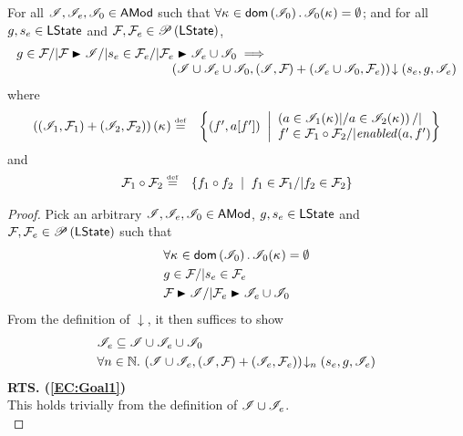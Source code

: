 \begin{lemma}\label{lem:extend-closure}
%
For all $\mathscr{I}, \mathscr{I}_{e}, \mathscr{I}_{0} \in \textsf{AMod}$ such that $\forall \kappa_{} \in \textsf{dom}\left( \mathscr{I}_0 \right).\, \mathscr{I}_0(\kappa_{}) = \emptyset$; and for all $g, s_e \in \textsf{LState}$ and $\mathcal{F}_{}, \mathcal{F}_{e} \in \mathscr{P}\left(\textsf{LState} \right)$,
\[
\begin{array}{l l}
	g \in \fence{} /| \fence{} \strictfences \lmod /| s_e \in \fence{e} /| \fence{e} \strictfences \lmod_e \cup \lmod_0
	\implies & \\
	& \hspace{-3cm} \extendsAM{\lmod \cup \lmod_{e} \cup \lmod_0, (\lmod, \fence{}) + (\lmod_{e} \cup \lmod_0, \fence{e}) }{s_{e}}{g}{\lmod_{e}}
\end{array}
\]
%
where
%
\[
\begin{array}{@{} l  l @{}}
	\left( (\lmod_1, \fence{1}) + (\lmod_{2}, \fence{2}) \right)(\ca{}) \eqdef  & 
	\left\{
		(f', a[f']) \;\;\middle|
		\begin{array}{ l @{}}
			\left(a \in \lmod_{1}(\ca{}) |/ a \in \lmod_{2}(\ca{})  \right) /| \\
			f' \in \fence{1} \composeL \fence{2} /| \m{enabled}(a, f')	
		\end{array}		  
	\right\}\\
\end{array}
\]
%
and
%
\[
\begin{array}{@{} l l @{}}
	\fence{1} \composeL \fence{2} \eqdef & 
	\left\{
		f_{1} \composeL f_{2} \;\;\middle|\;\; 
		f_{1} \in \fence{1} /| f_{2} \in \fence{2}
	\right\}
\end{array}
\]
%
\begin{proof} Pick an arbitrary $\mathscr{I}, \mathscr{I}_e, \mathscr{I}_0 \in \textsf{AMod}$, $g, s_e \in \textsf{LState}$ and $\mathcal{F}_{}, \mathcal{F}_{e} \in \mathscr{P}\left(\textsf{LState} \right)$ such that 
%
\begin{align}
	& \for{\ca{} \in \dom{\lmod_0}} \lmod_0(\ca{}) = \emptyset \label{EC:Ass0}\\
	& g \in \fence{} /|  s_e \in \fence{e}   \label{EC:Ass1}\\
	& \fence{} \strictfences \lmod /| \fence{e} \strictfences \lmod_e \cup \lmod_0 \label{EC:Ass2}
\end{align} 
%
From the definition of $\downarrow$, it then suffices to show
%
\begin{align}
	& \mathscr{I}_e \subseteq \mathscr{I} \cup \mathscr{I}_e \cup \mathscr{I}_0 \label{EC:Goal1}\\
	& \forall n \in \mathbb{N}.\,  \left(\mathscr{I} \cup \mathscr{I}_e, (\mathscr{I}, \mathcal{F}_{}) + (\mathscr{I}_{e}, \mathcal{F}_{e})\right) \!\downarrow_{n} \left(s_e, g, \mathscr{I}_e\right) \label{EC:Goal2}
\end{align}
%
\noindent\textbf{RTS. (\ref{EC:Goal1})} \\
This holds trivially from the definition of $\mathscr{I} \cup \mathscr{I}_e$.\\


\end{proof}
\end{lemma}

